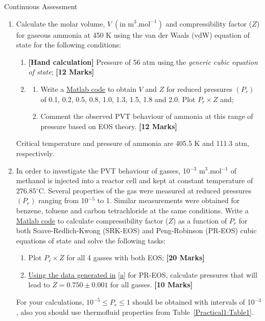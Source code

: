 \documentclass[12pts,a4paper,amsmath,amssymb,floatfix]{article}%
\renewcommand\leq{\leqslant}
\begin{document}
\begin{center}
  {\Large Continuous Assessment}
\end{center}


\begin{enumerate}[label=\bfseries Problem \arabic*:]
%
     \item\label{Prob1} Calculate the molar volume, $V\;\left(\text{in m}^{3}\text{.mol}^{-1}\right)$ and compressibility factor ($Z$) for gaseous ammonia at 450 K using the van der Waals (vdW) equation of state for the following conditions:
          \begin{enumerate}[label=\bfseries Task \arabic*]
              \item\label{c} {\bf[Hand calculation]} Pressure of 56 atm using the {\it generic cubic equation of state}; \hfill{\bf[12 Marks]}
              \item\label{d}
                \begin{enumerate} 
                \item Write a \underline{Matlab code} to obtain $V$ and $Z$ for reduced pressures $\left(P_{r}\right)$ of 0.1, 0.2, 0.5, 0.8, 1.0, 1.3, 1.5, 1.8 and 2.0. Plot $P_{r}\times Z$ and;
                \item Comment the observed PVT behaviour of ammonia at this range of pressure based on EOS theory. \hfill{\bf[12 Marks]}
                  \end{enumerate}
          \end{enumerate}
          Critical temperature and pressure of ammonia are 405.5 K and 111.3 atm, respectively.

     \item\label{Prob2} In order to investigate the PVT behaviour of gasses, 10$^{-3}$ m$^{3}$.mol$^{-1}$ of methanol is injected into a reactor cell and kept at constant temperature of 276.85$^{\circ}$C. Several properties of the gas were measured at reduced pressures $\left(P_{r}\right)$ ranging from 10$^{-5}$ to 1.  Similar measurements were obtained for benzene, toluene and carbon tetrachloride at the same conditions. Write a \underline{Matlab code} to calculate compressibility factor ($Z$) as a function of $P_{r}$ for both Soave-Redlich-Kwong (SRK-EOS) and Peng-Robinson (PR-EOS) cubic equations of state and solve the following tasks:
          \begin{enumerate}[label=\bfseries Task \arabic*]
              \item\label{a} Plot $P_{r}\times Z$ for all 4 gasses with both EOS; \hfill{\bf[20 Marks]} 
              \item\label{b} \underline{Using the data generated in} \ref{a} for PR-EOS, calculate pressures that will lead to $Z=0.750\pm0.001$ for all gasses. \hfill{\bf[10 Marks]} 
          \end{enumerate}
For your calculations, $10^{-5}\leq P_{r}\leq 1$ should be obtained with intervals of 10$^{-3}$, also you should use thermofluid properties from Table~\ref{Practical1:Table1}. 


\end{enumerate}
\end{document}
